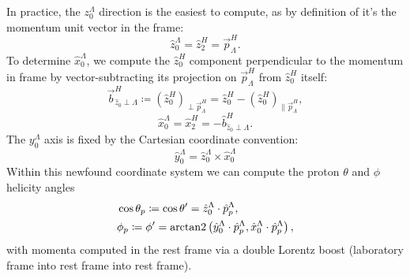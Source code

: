 In practice, the $z_0^\Lambda$ direction is the easiest to compute, as by definition of \slambda it's the \lbz momentum unit vector in the \shad frame:
\begin{equation}
	\hat{z}_0^\Lambda = \hat{z}_2^H = \vec{p}_\Lambda^H.
\end{equation}
%
To determine $\hat{x}_0^\Lambda$, we compute the $\hat{z}_0^H$ component perpendicular to the \lz momentum in \shad frame by vector-subtracting its projection on $\vec{p}_\Lambda^H$ from $\hat{z}_0^H$ itself:
\begin{equation}
	\vec{b}^H_{\hat{z}_0 \perp \Lambda}
	\coloneqq
	\left(\hat{z}_0^H\right)_{\perp \vec{p}_\Lambda^H}
	=
	\hat{z}_0^H - \left(\hat{z}_0^H\right)_{\parallel \vec{p}_\Lambda^H},
\end{equation}
\begin{equation}
	\hat{x}_0^\Lambda = \hat{x}_2^H
	=
	- \hat{b}^H_{\hat{z}_0 \perp \Lambda}.
\end{equation}
The $y_0^\Lambda$ axis is fixed by the Cartesian coordinate convention:
\begin{equation}
	\hat{y}_0^\Lambda = \hat{z}_0^\Lambda \times \hat{x}_0^\Lambda
\end{equation}
Within this newfound coordinate system we can compute the proton $\theta$ and $\phi$ helicity angles
\begin{subequations}
	\label{eq:5:helicity_angles}
	\begin{align}
		&\cos\theta_p \coloneqq \cos\theta'
		=
		\hat{z}_0^\Lambda \cdot \hat{p}_p^\Lambda,
		\label{eq:5:helicity_theta} \\
		&\phi_p \coloneqq \phi'
		=
		\operatorname{arctan2}
		\left(
			\hat{y}_0^\Lambda \cdot \hat{p}_p^\Lambda,
			\hat{x}_0^\Lambda \cdot \hat{p}_p^\Lambda
		\right),
		\label{eq:5:helicity_phi}
	\end{align}
\end{subequations}
with momenta computed in the \lz rest frame via a double Lorentz boost (laboratory frame into \lbz rest frame into \lz rest frame).

